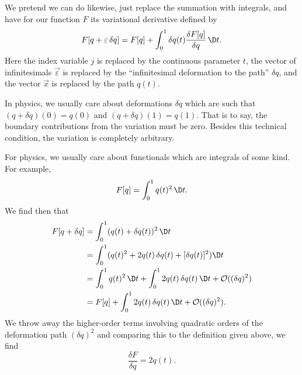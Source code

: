 We pretend we can do likewise, just replace the summation with
integrals, and have for our function $F$ its variational derivative defined by
\begin{equation}
F[q + \varepsilon\,\delta q] = F[q] + \int^{1}_{0}\delta
q(t)\frac{\delta F[q]}{\delta q}\,\D t.
\end{equation}
Here the index variable $j$ is replaced by the continuous parameter $t$,
the vector of infinitesimals $\vec{\varepsilon}$ is replaced by the
``infinitesimal deformation to the path'' $\delta q$, and the vector
$\vec{x}$ is replaced by the path $q(t)$.

In physics, we usually care about deformations $\delta q$ which are such
that $(q + \delta q)(0) = q(0)$ and $(q + \delta q)(1)=q(1)$. That is to
say, the boundary contributions from the variation must be zero. Besides
this technical condition, the variation is completely arbitrary. 

\begin{example}
For physics, we usually care about functionals which are integrals of
some kind. For example,
\begin{equation}
F[q] = \int^{1}_{0}q(t)^{2}\,\D t.
\end{equation}
We find then that
\begin{subequations}
\begin{align}
F[q + \delta q] &= \int^{1}_{0}(q(t) + \delta q(t))^{2}\,\D t\\
&= \int^{1}_{0}(q(t)^{2} + 2q(t)\,\delta q(t) + [\delta q(t)]^{2})\D t\\
&= \int^{1}_{0}q(t)^{2}\,\D t + \int^{1}_{0}2q(t)\,\delta q(t)\,\D t +
\mathcal{O}((\delta q)^{2})\\
&= F[q] + \int^{1}_{0}2q(t)\,\delta q(t)\,\D t +
\mathcal{O}((\delta q)^{2}).
\end{align}
\end{subequations}
We throw away the higher-order terms involving quadratic orders of the
deformation path $(\delta q)^2$ and comparing this to the definition
given above, we find
\begin{equation}
\frac{\delta F}{\delta q} = 2q(t).
\end{equation}
\end{example}

